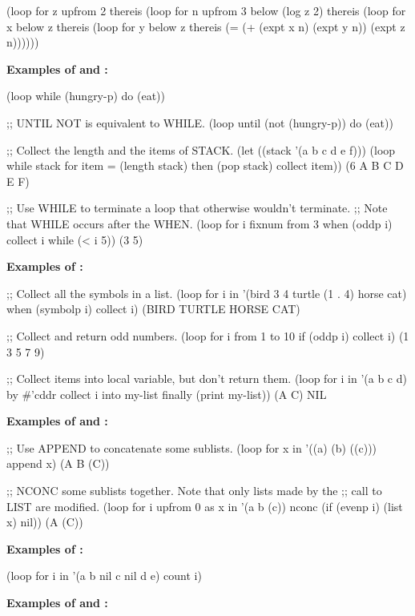  (loop for z upfrom 2
       thereis
         (loop for n upfrom 3 below (log z 2)
               thereis
                 (loop for x below z
                       thereis
                         (loop for y below z
                               thereis (= (+ (expt x n) (expt y n))
                                          (expt z n))))))
\endcode

{\bf Examples of  and :}

\code
 (loop while (hungry-p) do (eat))
 
;; UNTIL NOT is equivalent to WHILE.
 (loop until (not (hungry-p)) do (eat))
 
;; Collect the length and the items of STACK.
 (let ((stack '(a b c d e f)))
   (loop while stack
         for item = (length stack) then (pop stack)
         collect item))
\EV (6 A B C D E F)
 
;; Use WHILE to terminate a loop that otherwise wouldn't terminate.
;; Note that WHILE occurs after the WHEN.
 (loop for i fixnum from 3
       when (oddp i) collect i
       while (< i 5))
\EV (3 5)
\endcode


{\bf Examples of :}

\code
;; Collect all the symbols in a list.
 (loop for i in '(bird 3 4 turtle (1 . 4) horse cat)
       when (symbolp i) collect i)
\EV (BIRD TURTLE HORSE CAT)
 
;; Collect and return odd numbers.
 (loop for i from 1 to 10
       if (oddp i) collect i)
\EV (1 3 5 7 9)
 
;; Collect items into local variable, but don't return them.
 (loop for i in '(a b c d) by #'cddr
       collect i into my-list
       finally (print my-list))
\OUT (A C) 
\EV NIL
\endcode
 
{\bf Examples of  and :}

\code
;; Use APPEND to concatenate some sublists.
  (loop for x in '((a) (b) ((c)))
        append x)
\EV (A B (C))
 
;; NCONC some sublists together.  Note that only lists made by the
;; call to LIST are modified.
  (loop for i upfrom 0 
        as x in '(a b (c))
        nconc (if (evenp i) (list x) nil))
\EV (A (C))
\endcode


 
{\bf Examples of :}

\code
 (loop for i in '(a b nil c nil d e)
       count i)
\endcode
 
{\bf Examples of  and :}

